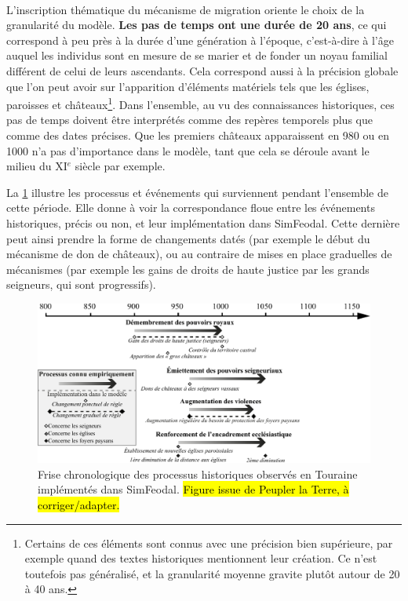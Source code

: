 \paragraph[Pas de temps de 20 ans]{} L'inscription thématique du mécanisme de migration oriente le choix de la granularité du modèle.
\textbf{Les pas de temps ont une durée de 20 ans}, ce qui correspond à peu près à la durée d'une génération à l'époque, c'est-à-dire à l'âge auquel les individus sont en mesure de se marier et de fonder un noyau familial différent de celui de leurs ascendants.
Cela correspond aussi à la précision globale que l'on peut avoir sur l'apparition d'éléments matériels tels que les églises, paroisses et châteaux\footnote{
Certains de ces éléments sont connus avec une précision bien supérieure, par exemple quand des textes historiques mentionnent leur création.
Ce n'est toutefois pas généralisé, et la granularité moyenne gravite plutôt autour de 20 à 40 ans.
}.
Dans l'ensemble, au vu des connaissances historiques, ces pas de temps doivent être interprétés comme des repères temporels plus que comme des dates précises. 
Que les premiers châteaux apparaissent en 980 ou en 1000 n'a pas d'importance dans le modèle, tant que cela se déroule avant le milieu du XI$^e$ siècle par exemple.

La \cref{fig:frise-chrono} illustre les processus et événements qui surviennent pendant l'ensemble de cette période.
Elle donne à voir la correspondance floue entre les événements historiques, précis ou non, et leur implémentation dans SimFeodal.
Cette dernière peut ainsi prendre la forme de changements datés (par exemple le début du mécanisme de don de châteaux), ou au contraire de mises en place graduelles de mécanismes (par exemple les gains de droits de haute justice par les grands seigneurs, qui sont progressifs).

\begin{figure}[H]
	\centering
	\includegraphics[width=\linewidth]{img/frise_chrono_tmd.pdf}
	\caption{Frise chronologique des processus historiques observés en Touraine implémentés dans SimFeodal. \hl{Figure issue de Peupler la Terre, à corriger/adapter.}}
	\label{fig:frise-chrono}
\end{figure}



